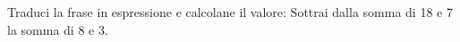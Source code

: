 \item Traduci la frase in espressione e calcolane il valore: Sottrai dalla somma di 18 e 7  la somma di 8 e 3.
